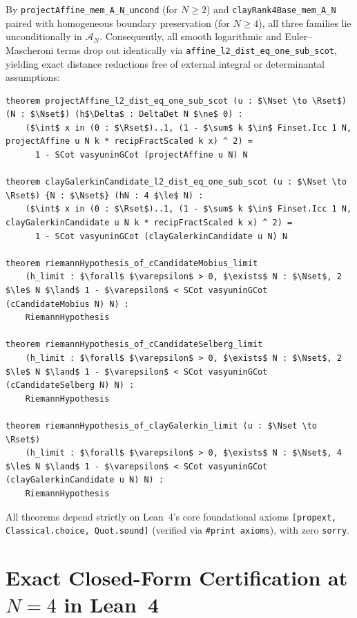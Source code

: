 \documentclass[11pt,a4paper]{article}
\theoremstyle{definition}
\newcommand{\Nset}{\mathbb{N}}
\newcommand{\Rset}{\mathbb{R}}
\begin{document}
By \texttt{projectAffine\_mem\_A\_N\_uncond} (for $N \ge 2$) and \texttt{clayRank4Base\_mem\_A\_N} paired with homogeneous boundary preservation (for $N \ge 4$), all three families lie unconditionally in $\mathcal{A}_N$. Consequently, all smooth logarithmic and Euler--Mascheroni terms drop out identically via \texttt{affine\_l2\_dist\_eq\_one\_sub\_scot}, yielding exact distance reductions free of external integral or determinantal assumptions:
\begin{lstlisting}
theorem projectAffine_l2_dist_eq_one_sub_scot (u : $\Nset \to \Rset$) (N : $\Nset$) (h$\Delta$ : DeltaDet N $\ne$ 0) :
    ($\int$ x in (0 : $\Rset$)..1, (1 - $\sum$ k $\in$ Finset.Icc 1 N, projectAffine u N k * recipFractScaled k x) ^ 2) =
      1 - SCot vasyuninGCot (projectAffine u N) N

theorem clayGalerkinCandidate_l2_dist_eq_one_sub_scot (u : $\Nset \to \Rset$) {N : $\Nset$} (hN : 4 $\le$ N) :
    ($\int$ x in (0 : $\Rset$)..1, (1 - $\sum$ k $\in$ Finset.Icc 1 N, clayGalerkinCandidate u N k * recipFractScaled k x) ^ 2) =
      1 - SCot vasyuninGCot (clayGalerkinCandidate u N) N

theorem riemannHypothesis_of_cCandidateMobius_limit
    (h_limit : $\forall$ $\varepsilon$ > 0, $\exists$ N : $\Nset$, 2 $\le$ N $\land$ 1 - $\varepsilon$ < SCot vasyuninGCot (cCandidateMobius N) N) :
    RiemannHypothesis

theorem riemannHypothesis_of_cCandidateSelberg_limit
    (h_limit : $\forall$ $\varepsilon$ > 0, $\exists$ N : $\Nset$, 2 $\le$ N $\land$ 1 - $\varepsilon$ < SCot vasyuninGCot (cCandidateSelberg N) N) :
    RiemannHypothesis

theorem riemannHypothesis_of_clayGalerkin_limit (u : $\Nset \to \Rset$)
    (h_limit : $\forall$ $\varepsilon$ > 0, $\exists$ N : $\Nset$, 4 $\le$ N $\land$ 1 - $\varepsilon$ < SCot vasyuninGCot (clayGalerkinCandidate u N) N) :
    RiemannHypothesis
\end{lstlisting}
All theorems depend strictly on Lean~4's core foundational axioms \texttt{[propext, Classical.choice, Quot.sound]} (verified via \texttt{\#print axioms}), with zero \texttt{sorry}.

\section{Exact Closed-Form Certification at \texorpdfstring{$N = 4$}{N = 4} in Lean~4}\label{sec:N4}
\end{document}
